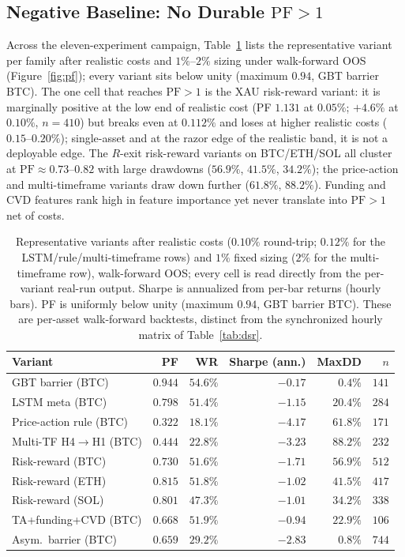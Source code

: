 \documentclass[sigconf,anonymous]{acmart}
\begin{document}
\subsection{Negative Baseline: No Durable $\mathrm{PF}{>}1$}
Across the eleven-experiment campaign, Table~\ref{tab:baseline} lists the representative variant per family after realistic costs and $1\%$–$2\%$ sizing under walk-forward OOS (Figure~\ref{fig:pf}); every variant sits below unity (maximum $0.94$, GBT barrier BTC). The one cell that reaches $\mathrm{PF}{>}1$ is the XAU risk-reward variant: it is marginally positive at the low end of realistic cost (PF $1.131$ at $0.05\%$; $+4.6\%$ at $0.10\%$, $n{=}410$) but breaks even at $0.112\%$ and loses at higher realistic costs ($0.15$–$0.20\%$); single-asset and at the razor edge of the realistic band, it is not a deployable edge. The $R$-exit risk-reward variants on BTC/ETH/SOL all cluster at $\mathrm{PF}\approx 0.73$–$0.82$ with large drawdowns ($56.9\%$, $41.5\%$, $34.2\%$); the price-action and multi-timeframe variants draw down further ($61.8\%$, $88.2\%$). Funding and CVD features rank high in feature importance yet never translate into $\mathrm{PF}{>}1$ net of costs.

\begin{table}[t]
  \caption{Representative variants after realistic costs ($0.10\%$ round-trip; $0.12\%$ for the LSTM/rule/multi-timeframe rows) and $1\%$ fixed sizing ($2\%$ for the multi-timeframe row), walk-forward OOS; every cell is read directly from the per-variant real-run output. Sharpe is annualized from per-bar returns (hourly bars). PF is uniformly below unity (maximum $0.94$, GBT barrier BTC). These are per-asset walk-forward backtests, distinct from the synchronized hourly matrix of Table~\ref{tab:dsr}.}
  \label{tab:baseline}
  \small
  \begin{tabular}{lrrrrr}
    \toprule
    Variant & PF & WR & Sharpe (ann.) & MaxDD & $n$ \\
    \midrule
    GBT barrier (BTC)        & $0.944$ & $54.6\%$ & $-0.17$ & $0.4\%$  & $141$ \\
    LSTM meta (BTC)          & $0.798$ & $51.4\%$ & $-1.15$ & $20.4\%$ & $284$ \\
    Price-action rule (BTC)  & $0.322$ & $18.1\%$ & $-4.17$ & $61.8\%$ & $171$ \\
    Multi-TF H4$\to$H1 (BTC) & $0.444$ & $22.8\%$ & $-3.23$ & $88.2\%$ & $232$ \\
    Risk-reward (BTC)        & $0.730$ & $51.6\%$ & $-1.71$ & $56.9\%$ & $512$ \\
    Risk-reward (ETH)        & $0.815$ & $51.8\%$ & $-1.02$ & $41.5\%$ & $417$ \\
    Risk-reward (SOL)        & $0.801$ & $47.3\%$ & $-1.01$ & $34.2\%$ & $338$ \\
    TA+funding+CVD (BTC)     & $0.668$ & $51.9\%$ & $-0.94$ & $22.9\%$ & $106$ \\
    Asym.\ barrier (BTC)     & $0.659$ & $29.2\%$ & $-2.83$ & $0.8\%$  & $744$ \\
    \bottomrule
  \end{tabular}
\end{table}
\end{document}
